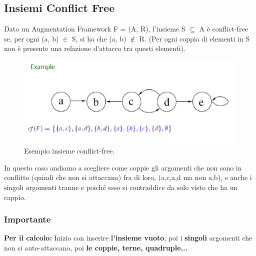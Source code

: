 \subsection{Insiemi Conflict Free}
Dato un Augmentation Framework F = (A, R), l'insieme S $\subseteq$ A è conflict-free se, per ogni (a, b) $\in$ S, si ha che (a, b) $\notin$ R. (Per ogni coppia di elementi in S non è presente una relazione d'attacco tra questi elementi).
\begin{figure}[H]
    \centering
    \includegraphics[width=12cm, keepaspectratio]{img/Cap6/cf.png}
    \caption{Esempio insieme conflict-free.}
\end{figure}

In questo caso andiamo a scegliere come coppie gli argomenti che non sono in conflitto (quindi che non si attaccano) fra di loro, ({a,c},{a,d} ma non {a,b}), e anche i singoli argomenti tranne e poiché esso si contraddice da solo visto che ha un cappio.

\subsubsection{\textbf{Importante}}
\textbf{Per il calcolo:} Inizio con inserire \textbf{l'insieme vuoto}, poi i \textbf{singoli} argomenti che non si auto-attaccano, poi \textbf{le coppie, terne, quadruple...}

